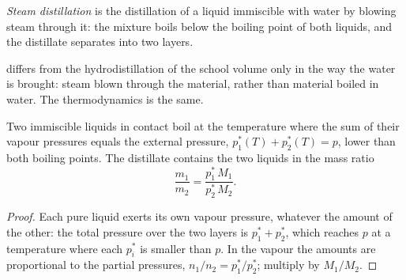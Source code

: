 \begin{definition}\label{def:b2:liquid-vapour-diagrams:steam-distillation}
\emph{Steam distillation} is the distillation of a
liquid immiscible with water by blowing steam through it: the mixture boils
below the boiling point of both liquids, and the distillate separates into
two layers.
\end{definition}

 differs from the hydrodistillation of the school volume
only in the way the water is brought: steam blown through the material, rather
than material boiled in water. The thermodynamics is the same.

\begin{proposition}\label{prop:b2:liquid-vapour-diagrams:steam}
Two immiscible liquids in contact boil at the temperature where the sum of
their vapour pressures equals the external pressure, $p_1^*(T) + p_2^*(T) =
p$, lower than both boiling points. The distillate contains the two liquids
in the mass ratio
\[
  \frac{m_1}{m_2} = \frac{p_1^*\,M_1}{p_2^*\,M_2} .
\]
\end{proposition}

\begin{proof}
Each pure liquid exerts its own vapour pressure, whatever the amount of the
other: the total pressure over the two layers is $p_1^* + p_2^*$, which
reaches $p$ at a temperature where each $p_i^*$ is smaller than $p$. In the
vapour the amounts are proportional to the partial pressures, $n_1/n_2 =
p_1^*/p_2^*$; multiply by $M_1/M_2$.
\end{proof}

